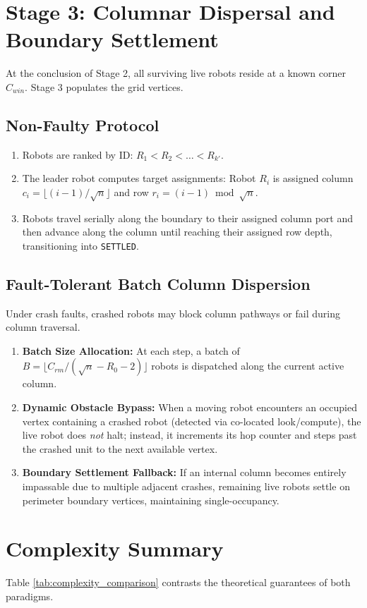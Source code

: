 \documentclass[11pt,a4paper]{report}
\begin{document}
\section{Stage 3: Columnar Dispersal and Boundary Settlement}
At the conclusion of Stage 2, all surviving live robots reside at a known corner $C_{win}$. Stage 3 populates the grid vertices.

\subsection{Non-Faulty Protocol}
\begin{enumerate}
    \item Robots are ranked by ID: $R_1 < R_2 < \dots < R_{k'}$.
    \item The leader robot computes target assignments: Robot $R_i$ is assigned column $c_i = \lfloor (i-1)/\sqrt{n} \rfloor$ and row $r_i = (i-1) \bmod \sqrt{n}$.
    \item Robots travel serially along the boundary to their assigned column port and then advance along the column until reaching their assigned row depth, transitioning into \texttt{SETTLED}.
\end{enumerate}

\subsection{Fault-Tolerant Batch Column Dispersion}
Under crash faults, crashed robots may block column pathways or fail during column traversal.
\begin{enumerate}
    \item \textbf{Batch Size Allocation:} At each step, a batch of $B = \lfloor C_{rm}/(\sqrt{n} - R_0 - 2) \rfloor$ robots is dispatched along the current active column.
    \item \textbf{Dynamic Obstacle Bypass:} When a moving robot encounters an occupied vertex containing a crashed robot (detected via co-located look/compute), the live robot does \emph{not} halt; instead, it increments its hop counter and steps past the crashed unit to the next available vertex.
    \item \textbf{Boundary Settlement Fallback:} If an internal column becomes entirely impassable due to multiple adjacent crashes, remaining live robots settle on perimeter boundary vertices, maintaining single-occupancy.
\end{enumerate}

\section{Complexity Summary}
Table \ref{tab:complexity_comparison} contrasts the theoretical guarantees of both paradigms.
\end{document}
